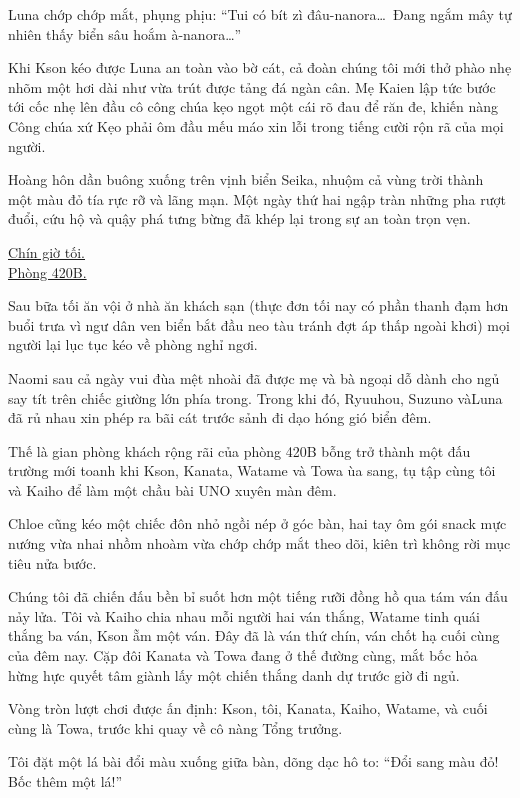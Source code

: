 \documentclass[../main.tex]{subfiles}
\begin{document}
Luna chớp chớp mắt, phụng phịu: ``Tui có bít zì đâu-nanora\dots\ Đang ngắm mây tự nhiên thấy biển sâu hoắm à-nanora\dots''

Khi Kson kéo được Luna an toàn vào bờ cát, cả đoàn chúng tôi mới thở phào nhẹ nhõm một hơi dài như vừa trút được tảng đá ngàn cân. Mẹ Kaien lập tức bước tới cốc nhẹ lên đầu cô công chúa kẹo ngọt một cái rõ đau để răn đe, khiến nàng Công chúa xứ Kẹo phải ôm đầu mếu máo xin lỗi trong tiếng cười rộn rã của mọi người.

Hoàng hôn dần buông xuống trên vịnh biển Seika, nhuộm cả vùng trời thành một màu đỏ tía rực rỡ và lãng mạn. Một ngày thứ hai ngập tràn những pha rượt đuổi, cứu hộ và quậy phá tưng bừng đã khép lại trong sự an toàn trọn vẹn.

\ct

\begin{center}
  \uline{Chín giờ tối.\\Phòng 420B.}
\end{center}

Sau bữa tối ăn vội ở nhà ăn khách sạn (thực đơn tối nay có phần thanh đạm hơn buổi trưa vì ngư dân ven biển bắt đầu neo tàu tránh đợt áp thấp ngoài khơi) mọi người lại lục tục kéo về phòng nghỉ ngơi.

Naomi sau cả ngày vui đùa mệt nhoài đã được mẹ và bà ngoại dỗ dành cho ngủ say tít trên chiếc giường lớn phía trong. Trong khi đó, Ryuuhou, Suzuno vàLuna đã rủ nhau xin phép ra bãi cát trước sảnh đi dạo hóng gió biển đêm.

Thế là gian phòng khách rộng rãi của phòng 420B bỗng trở thành một đấu trường mới toanh khi Kson, Kanata, Watame và Towa ùa sang, tụ tập cùng tôi và Kaiho để làm một chầu bài UNO xuyên màn đêm.

Chloe cũng kéo một chiếc đôn nhỏ ngồi nép ở góc bàn, hai tay ôm gói snack mực nướng vừa nhai nhồm nhoàm vừa chớp chớp mắt theo dõi, kiên trì không rời mục tiêu nửa bước.

Chúng tôi đã chiến đấu bền bỉ suốt hơn một tiếng rưỡi đồng hồ qua tám ván đấu nảy lửa. Tôi và Kaiho chia nhau mỗi người hai ván thắng, Watame tinh quái thắng ba ván, Kson ẵm một ván. Đây đã là ván thứ chín, ván chốt hạ cuối cùng của đêm nay. Cặp đôi Kanata và Towa đang ở thế đường cùng, mắt bốc hỏa hừng hực quyết tâm giành lấy một chiến thắng danh dự trước giờ đi ngủ.

Vòng tròn lượt chơi được ấn định: Kson, tôi, Kanata, Kaiho, Watame, và cuối cùng là Towa, trước khi quay về cô nàng Tổng trưởng.

Tôi đặt một lá bài đổi màu xuống giữa bàn, dõng dạc hô to: ``Đổi sang màu đỏ! Bốc thêm một lá!''
\end{document}
